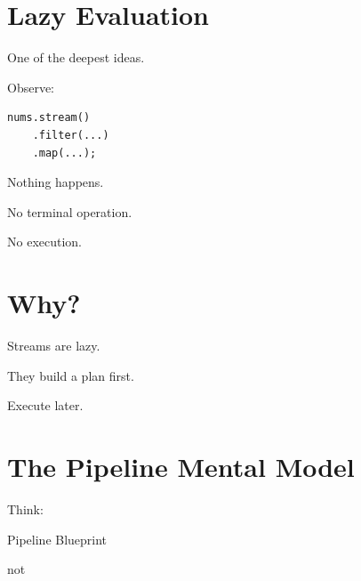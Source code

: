 \documentclass[11pt,a4paper]{book}
\begin{document}

\section{Lazy Evaluation}

One of the deepest ideas.


Observe:

\begin{verbatim} 
nums.stream()
    .filter(...)
    .map(...);
\end{verbatim}


Nothing happens.


No terminal operation.


No execution.


\section{Why?}

Streams are lazy.


They build a plan first.


Execute later.


\section{The Pipeline Mental Model}

Think:


Pipeline Blueprint


not
\end{document}

